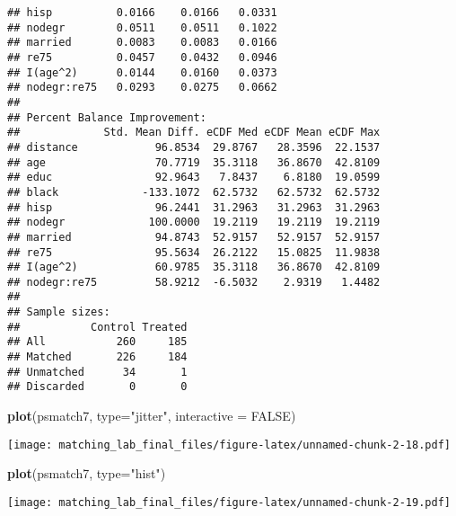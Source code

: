 \documentclass[]{article}
\newenvironment{Shaded}{\begin{snugshade}}{\end{snugshade}}
\newcommand{\DataTypeTok}[1]{\textcolor[rgb]{0.13,0.29,0.53}{#1}}
\newcommand{\KeywordTok}[1]{\textcolor[rgb]{0.13,0.29,0.53}{\textbf{#1}}}
\newcommand{\NormalTok}[1]{#1}
\newcommand{\OtherTok}[1]{\textcolor[rgb]{0.56,0.35,0.01}{#1}}
\newcommand{\StringTok}[1]{\textcolor[rgb]{0.31,0.60,0.02}{#1}}
\begin{document}
\begin{verbatim}
## hisp          0.0166    0.0166   0.0331
## nodegr        0.0511    0.0511   0.1022
## married       0.0083    0.0083   0.0166
## re75          0.0457    0.0432   0.0946
## I(age^2)      0.0144    0.0160   0.0373
## nodegr:re75   0.0293    0.0275   0.0662
## 
## Percent Balance Improvement:
##             Std. Mean Diff. eCDF Med eCDF Mean eCDF Max
## distance            96.8534  29.8767   28.3596  22.1537
## age                 70.7719  35.3118   36.8670  42.8109
## educ                92.9643   7.8437    6.8180  19.0599
## black             -133.1072  62.5732   62.5732  62.5732
## hisp                96.2441  31.2963   31.2963  31.2963
## nodegr             100.0000  19.2119   19.2119  19.2119
## married             94.8743  52.9157   52.9157  52.9157
## re75                95.5634  26.2122   15.0825  11.9838
## I(age^2)            60.9785  35.3118   36.8670  42.8109
## nodegr:re75         58.9212  -6.5032    2.9319   1.4482
## 
## Sample sizes:
##           Control Treated
## All           260     185
## Matched       226     184
## Unmatched      34       1
## Discarded       0       0
\end{verbatim}

\begin{Shaded}
\begin{Highlighting}[]
\KeywordTok{plot}\NormalTok{(psmatch7, }\DataTypeTok{type=}\StringTok{"jitter"}\NormalTok{, }\DataTypeTok{interactive =} \OtherTok{FALSE}\NormalTok{)}
\end{Highlighting}
\end{Shaded}

\texttt{[image: matching\_lab\_final\_files/figure-latex/unnamed-chunk-2-18.pdf]}

\begin{Shaded}
\begin{Highlighting}[]
\KeywordTok{plot}\NormalTok{(psmatch7, }\DataTypeTok{type=}\StringTok{"hist"}\NormalTok{)}
\end{Highlighting}
\end{Shaded}

\texttt{[image: matching\_lab\_final\_files/figure-latex/unnamed-chunk-2-19.pdf]}
\end{document}
